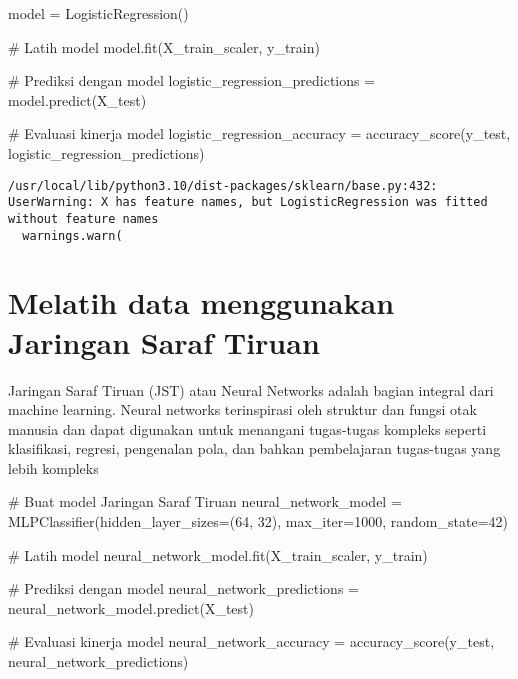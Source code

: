 \documentclass[
  letterpaper,
]{krantz}
\makeatletter
\newenvironment{Shaded}{\begin{snugshade}}{\end{snugshade}}
\newcommand{\CommentTok}[1]{\textcolor[rgb]{0.37,0.37,0.37}{#1}}
\newcommand{\DecValTok}[1]{\textcolor[rgb]{0.68,0.00,0.00}{#1}}
\newcommand{\NormalTok}[1]{\textcolor[rgb]{0.00,0.23,0.31}{#1}}
\newcommand{\OperatorTok}[1]{\textcolor[rgb]{0.37,0.37,0.37}{#1}}
\newenvironment{kframe}{%
\medskip{}
\setlength{\fboxsep}{.8em}
 \def\at@end@of@kframe{}%
 \ifinner\ifhmode%
  \def\at@end@of@kframe{\end{minipage}}%
  \begin{minipage}{\columnwidth}%
 \fi\fi%
 \def\FrameCommand##1{\hskip\@totalleftmargin \hskip-\fboxsep
 \colorbox{shadecolor}{##1}\hskip-\fboxsep
     \hskip-\linewidth \hskip-\@totalleftmargin \hskip\columnwidth}%
 \MakeFramed {\advance\hsize-\width
   \@totalleftmargin\z@ \linewidth\hsize
   \@setminipage}}%
 {\par\unskip\endMakeFramed%
 \at@end@of@kframe}
\renewenvironment{Shaded}{\begin{kframe}}{\end{kframe}}
\makeatother
\begin{document}
\begin{Shaded}
\begin{Highlighting}[]
\NormalTok{model }\OperatorTok{=}\NormalTok{ LogisticRegression()}

\CommentTok{\# Latih model}
\NormalTok{model.fit(X\_train\_scaler, y\_train)}

\CommentTok{\# Prediksi dengan model}
\NormalTok{logistic\_regression\_predictions }\OperatorTok{=}\NormalTok{ model.predict(X\_test)}

\CommentTok{\# Evaluasi kinerja model}
\NormalTok{logistic\_regression\_accuracy }\OperatorTok{=}\NormalTok{ accuracy\_score(y\_test, logistic\_regression\_predictions)}
\end{Highlighting}
\end{Shaded}

\begin{verbatim}
/usr/local/lib/python3.10/dist-packages/sklearn/base.py:432: UserWarning: X has feature names, but LogisticRegression was fitted without feature names
  warnings.warn(
\end{verbatim}

\hypertarget{melatih-data-menggunakan-jaringan-saraf-tiruan-1}{%
\section{Melatih data menggunakan Jaringan Saraf
Tiruan}\label{melatih-data-menggunakan-jaringan-saraf-tiruan-1}}

Jaringan Saraf Tiruan (JST) atau Neural Networks adalah bagian integral
dari machine learning. Neural networks terinspirasi oleh struktur dan
fungsi otak manusia dan dapat digunakan untuk menangani tugas-tugas
kompleks seperti klasifikasi, regresi, pengenalan pola, dan bahkan
pembelajaran tugas-tugas yang lebih kompleks

\begin{Shaded}
\begin{Highlighting}[]

\CommentTok{\# Buat model Jaringan Saraf Tiruan}
\NormalTok{neural\_network\_model }\OperatorTok{=}\NormalTok{ MLPClassifier(hidden\_layer\_sizes}\OperatorTok{=}\NormalTok{(}\DecValTok{64}\NormalTok{, }\DecValTok{32}\NormalTok{), max\_iter}\OperatorTok{=}\DecValTok{1000}\NormalTok{, random\_state}\OperatorTok{=}\DecValTok{42}\NormalTok{)}

\CommentTok{\# Latih model}
\NormalTok{neural\_network\_model.fit(X\_train\_scaler, y\_train)}

\CommentTok{\# Prediksi dengan model}
\NormalTok{neural\_network\_predictions }\OperatorTok{=}\NormalTok{ neural\_network\_model.predict(X\_test)}

\CommentTok{\# Evaluasi kinerja model}
\NormalTok{neural\_network\_accuracy }\OperatorTok{=}\NormalTok{ accuracy\_score(y\_test, neural\_network\_predictions)}
\end{Highlighting}
\end{Shaded}
\end{document}
